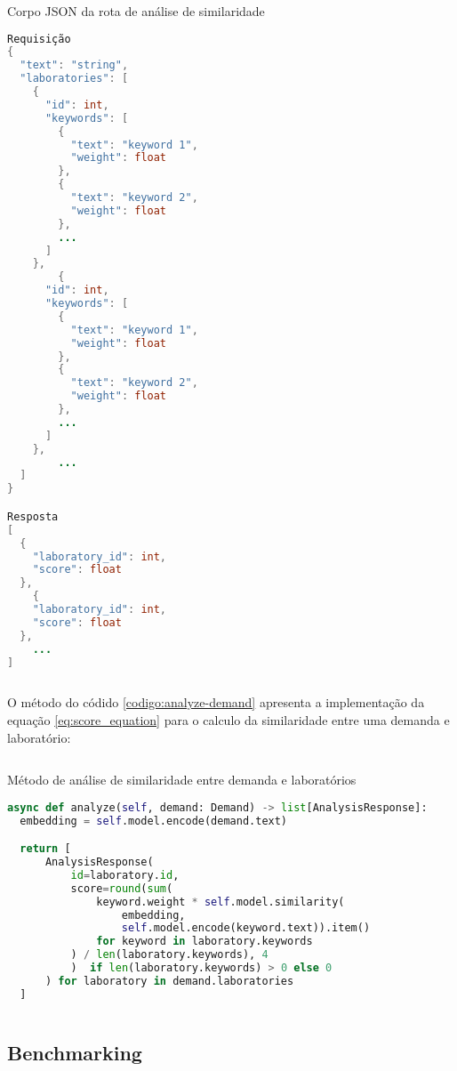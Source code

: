 \begin{sourcecode}[htb]
  \caption{\label{codigo:analyze}Corpo JSON da rota de análise de similaridade}
  \begin{lstlisting}[frame=single, language=Java]
Requisição
{
  "text": "string",
  "laboratories": [
    {
      "id": int,
      "keywords": [
        {
          "text": "keyword 1",
          "weight": float
        },
        {
          "text": "keyword 2",
          "weight": float
        },
        ...
      ]
    },
        {
      "id": int,
      "keywords": [
        {
          "text": "keyword 1",
          "weight": float
        },
        {
          "text": "keyword 2",
          "weight": float
        },
        ...
      ]
    },
        ...
  ]
}

Resposta
[
  {
    "laboratory_id": int,
    "score": float
  },
    {
    "laboratory_id": int,
    "score": float
  },
    ...
]
\end{lstlisting}
  \fonte{}
\end{sourcecode}

O método do códido \ref{codigo:analyze-demand} apresenta a implementação da equação \ref{eq:score_equation} para o calculo da similaridade entre uma demanda e laboratório:

\begin{sourcecode}[htb]
  \caption{\label{codigo:analyze-demand}Método de análise de similaridade entre demanda e laboratórios}
  \begin{lstlisting}[frame=single, language=Python]
async def analyze(self, demand: Demand) -> list[AnalysisResponse]:
  embedding = self.model.encode(demand.text)

  return [
      AnalysisResponse(
          id=laboratory.id, 
          score=round(sum(
              keyword.weight * self.model.similarity(
                  embedding, 
                  self.model.encode(keyword.text)).item()
              for keyword in laboratory.keywords
          ) / len(laboratory.keywords), 4
          )  if len(laboratory.keywords) > 0 else 0
      ) for laboratory in demand.laboratories
  ]
\end{lstlisting}
  \fonte{}
\end{sourcecode}

\subsection{Benchmarking}\label{subsec:benchmarking}